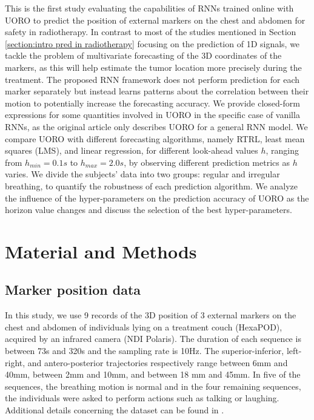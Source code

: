 \documentclass[twocolumn,a4paper]{svjour3} \sloppy          \smartqed
\begin{document}
This is the first study evaluating the capabilities of RNNs trained online with UORO to predict the position of external markers on the chest and abdomen for safety in radiotherapy. In contrast to most of the studies mentioned in Section \ref{section:intro pred in radiotherapy} focusing on the prediction of 1D signals, we tackle the problem of multivariate forecasting of the 3D coordinates of the markers, as this will help estimate the tumor location more precisely during the treatment. The proposed RNN framework does not perform prediction for each marker separately but instead learns patterns about the correlation between their motion to potentially increase the forecasting accuracy. We provide closed-form expressions for some quantities involved in UORO in the specific case of vanilla RNNs, as the original article \citep{tallec2017unbiased} only describes UORO for a general RNN model. We compare UORO with different forecasting algorithms, namely RTRL, least mean squares (LMS), and linear regression, for different look-ahead values $h$, ranging from $h_{min} = 0.1s$ to $h_{max} = 2.0s$, by observing different prediction metrics as $h$ varies. We divide the subjects' data into two groups: regular and irregular breathing, to quantify the robustness of each prediction algorithm. We analyze the influence of the hyper-parameters on the prediction accuracy of UORO as the horizon value changes and discuss the selection of the best hyper-parameters. 


\section{Material and Methods}

\subsection{Marker position data}

In this study, we use 9 records of the 3D position of 3 external markers on the chest and abdomen of individuals lying on a treatment couch (HexaPOD), acquired by an infrared camera (NDI Polaris). The duration of each sequence is between 73s and 320s and the sampling rate is 10Hz. The superior-inferior, left-right, and antero-posterior trajectories respectively range between 6mm and 40mm, between 2mm and 10mm, and between 18 mm and 45mm. In five of the sequences, the breathing motion is normal and in the four remaining sequences, the individuals were asked to perform actions such as talking or laughing. Additional details concerning the dataset can be found in \cite{krilavicius2016predicting}.
\end{document}
